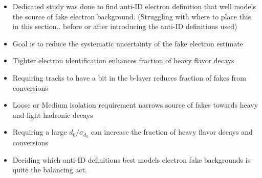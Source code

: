 \begin{itemize}
\item Dedicated study was done to find anti-ID electron definition that well models the source of fake electron background. (Struggling with where to place this in this section.. before or after introducing the anti-ID definitions used)
\item Goal is to reduce the systematic uncertainty of the fake electron estimate
\item Tighter electron identification enhances fraction of heavy flavor decays
\item Requiring tracks to have a bit in the b-layer reduces fraction of fakes from conversions
\item Loose or Medium isolation requirement narrows source of fakes towards heavy and light hadronic decays
\item Requiring a large $d_0/\sigma_{d_0}$ can increase the fraction of heavy flavor decays and conversions
\item Deciding which anti-ID definitions best models electron fake backgrounds is quite the balancing act.

\end{itemize}

